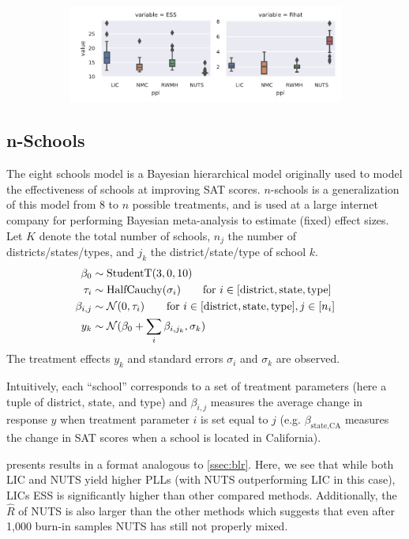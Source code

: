 \documentclass[../../thesis.tex]{subfiles}
\begin{document}
\begin{figure}
\begin{subfigure}[b]{\textwidth}
    \includegraphics[width=0.66\linewidth]{Figures/nschools_ess_rhat_type1.pdf}
  \end{subfigure}
\end{figure}


\subsection{n-Schools}
\label{ssec:nschools}

The eight schools model \citep{rubin1981estimation} is a Bayesian
hierarchical model originally used to model the effectiveness of schools at
improving SAT scores. $n$-schools is a generalization of this model from $8$
to $n$ possible treatments, and is used at a large internet company for
performing Bayesian meta-analysis \cite{sutton2001bayesian} to estimate
(fixed) effect sizes.
Let $K$ denote the total number of schools, $n_j$ the number of
districts/states/types, and $j_k$ the district/state/type of school $k$.
\begin{align*}
  \beta_0     & \sim \text{StudentT}(3, 0, 10)                                                                         \\
  \tau_{i}    & \sim \text{HalfCauchy}(\sigma_i) \qquad \text{for}~i \in [\text{district}, \text{state}, \text{type}]  \\
  \beta_{i,j} & \sim \mathcal{N}(0, \tau_i)  \qquad \text{for}~i \in [\text{district}, \text{state}, \text{type}], j \in [n_i] \\
  y_k         & \sim \mathcal{N}(\beta_0 + \sum_i \beta_{i,j_k}, \sigma_k)
\end{align*}
The treatment effects $y_k$ and standard errors $\sigma_i$ and $\sigma_k$ are observed.

Intuitively, each ``school'' corresponds to a set of treatment parameters
(here a tuple of district, state, and type) and $\beta_{i,j}$ measures the
average change in response $y$ when treatment parameter $i$ is set equal to
$j$ (e.g. $\beta_{\text{state},\text{CA}}$ measures the change in SAT scores
when a school is located in California).

 presents results in a format analogous to
\cref{ssec:blr}. Here, we see that while both LIC and NUTS yield higher PLLs
(with NUTS outperforming LIC in this case), LICs ESS is significantly higher
than other compared methods. Additionally, the $\widehat{R}$ of NUTS is also
larger than the other methods which suggests that even after 1,000 burn-in samples
NUTS has still not properly mixed.
\end{document}
